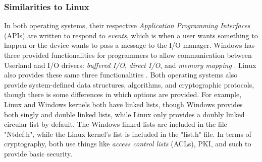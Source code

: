\documentclass[letterpaper,10pt,titlepage]{article}
\begin{document}
\subsubsection{Similarities to Linux}
In both operating systems, their respective \emph{Application Programming Interfaces} (APIs) are written to respond to \emph{events}, which is when a user wants something to happen or the device wants to pass a message to the I/O manager. Windows has three provided functionalities for programmers to allow communication between Userland and I/O drivers: \emph{buffered I/O}, \emph{direct I/O}, and \emph{memory mapping} \cite{windowsSys}. Linux also provides these same three functionalities \cite{linux}. Both operating systems also provide system-defined data structures, algorithms, and cryptographic protocols, though there is some differences in which options are provided. For example, Linux and Windows kernels both have linked lists, though Windows provides both singly and double linked lists, while Linux only provides a doubly linked circular list by default. The Windows linked lists are included in the file "Ntdef.h", while the Linux kernel's list is included in the "list.h" file. In terms of cryptography, both use things like \emph{access control lists} (ACLs), PKI, and such to provide basic security. 
\end{document}
